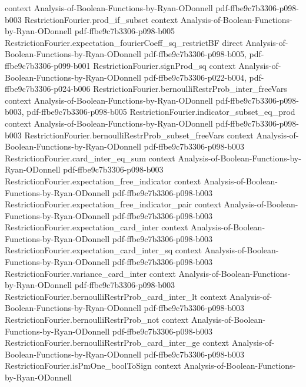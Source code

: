 \begin{lemma}
  {context}
  {Analysis-of-Boolean-Functions-by-Ryan-ODonnell}
  {pdf-ffbe9c7b3306-p098-b003}
\proofstep
  {RestrictionFourier.prod_if_subset}
  {context}
  {Analysis-of-Boolean-Functions-by-Ryan-ODonnell}
  {pdf-ffbe9c7b3306-p098-b005}
\proofstep
  {RestrictionFourier.expectation_fourierCoeff_sq_restrictBF}
  {direct}
  {Analysis-of-Boolean-Functions-by-Ryan-ODonnell}
  {pdf-ffbe9c7b3306-p098-b005,
    pdf-ffbe9c7b3306-p099-b001}
\proofstep
  {RestrictionFourier.signProd_sq}
  {context}
  {Analysis-of-Boolean-Functions-by-Ryan-ODonnell}
  {pdf-ffbe9c7b3306-p022-b004,
    pdf-ffbe9c7b3306-p024-b006}
\proofstep
  {RestrictionFourier.bernoulliRestrProb_inter_freeVars}
  {context}
  {Analysis-of-Boolean-Functions-by-Ryan-ODonnell}
  {pdf-ffbe9c7b3306-p098-b003,
    pdf-ffbe9c7b3306-p098-b005}
\proofstep
  {RestrictionFourier.indicator_subset_eq_prod}
  {context}
  {Analysis-of-Boolean-Functions-by-Ryan-ODonnell}
  {pdf-ffbe9c7b3306-p098-b003}
\proofstep
  {RestrictionFourier.bernoulliRestrProb_subset_freeVars}
  {context}
  {Analysis-of-Boolean-Functions-by-Ryan-ODonnell}
  {pdf-ffbe9c7b3306-p098-b003}
\proofstep
  {RestrictionFourier.card_inter_eq_sum}
  {context}
  {Analysis-of-Boolean-Functions-by-Ryan-ODonnell}
  {pdf-ffbe9c7b3306-p098-b003}
\proofstep
  {RestrictionFourier.expectation_free_indicator}
  {context}
  {Analysis-of-Boolean-Functions-by-Ryan-ODonnell}
  {pdf-ffbe9c7b3306-p098-b003}
\proofstep
  {RestrictionFourier.expectation_free_indicator_pair}
  {context}
  {Analysis-of-Boolean-Functions-by-Ryan-ODonnell}
  {pdf-ffbe9c7b3306-p098-b003}
\proofstep
  {RestrictionFourier.expectation_card_inter}
  {context}
  {Analysis-of-Boolean-Functions-by-Ryan-ODonnell}
  {pdf-ffbe9c7b3306-p098-b003}
\proofstep
  {RestrictionFourier.expectation_card_inter_sq}
  {context}
  {Analysis-of-Boolean-Functions-by-Ryan-ODonnell}
  {pdf-ffbe9c7b3306-p098-b003}
\proofstep
  {RestrictionFourier.variance_card_inter}
  {context}
  {Analysis-of-Boolean-Functions-by-Ryan-ODonnell}
  {pdf-ffbe9c7b3306-p098-b003}
\proofstep
  {RestrictionFourier.bernoulliRestrProb_card_inter_lt}
  {context}
  {Analysis-of-Boolean-Functions-by-Ryan-ODonnell}
  {pdf-ffbe9c7b3306-p098-b003}
\proofstep
  {RestrictionFourier.bernoulliRestrProb_not}
  {context}
  {Analysis-of-Boolean-Functions-by-Ryan-ODonnell}
  {pdf-ffbe9c7b3306-p098-b003}
\proofstep
  {RestrictionFourier.bernoulliRestrProb_card_inter_ge}
  {context}
  {Analysis-of-Boolean-Functions-by-Ryan-ODonnell}
  {pdf-ffbe9c7b3306-p098-b003}
\proofstep
  {RestrictionFourier.isPmOne_boolToSign}
  {context}
  {Analysis-of-Boolean-Functions-by-Ryan-ODonnell}

\end{lemma}
